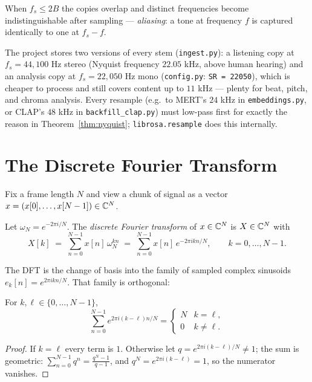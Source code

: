 When $f_s \le 2B$ the copies overlap and distinct frequencies become
indistinguishable after sampling --- \emph{aliasing}: a tone at frequency $f$
is captured identically to one at $f_s - f$.

\begin{incode}
The project stores two versions of every stem
(\texttt{ingest.py}): a listening copy at $f_s = 44{,}100$ Hz stereo
(Nyquist frequency $22.05$ kHz, above human hearing) and an analysis copy at
$f_s = 22{,}050$ Hz mono (\texttt{config.py}: \texttt{SR = 22050}), which is
cheaper to process and still covers content up to $11$ kHz --- plenty for
beat, pitch, and chroma analysis. Every resample (e.g.\ to MERT's $24$ kHz in
\texttt{embeddings.py}, or CLAP's $48$ kHz in \texttt{backfill\_clap.py})
must low-pass first for exactly the reason in
Theorem~\ref{thm:nyquist}; \texttt{librosa.resample} does this internally.
\end{incode}

\section{The Discrete Fourier Transform}

Fix a frame length $N$ and view a chunk of signal as a vector
$x = (x[0], \dots, x[N-1]) \in \mathbb{C}^N$.

\begin{definition}[DFT]\label{def:dft}
Let $\omega_N = e^{-2\pi i / N}$. The \emph{discrete Fourier transform} of
$x \in \mathbb{C}^N$ is $X \in \mathbb{C}^N$ with
\[
X[k] \;=\; \sum_{n=0}^{N-1} x[n]\, \omega_N^{kn}
\;=\; \sum_{n=0}^{N-1} x[n]\, e^{-2\pi i k n / N},
\qquad k = 0, \dots, N-1 .
\]
\end{definition}

The DFT is the change of basis into the family of sampled complex sinusoids
$e_k[n] = e^{2\pi i k n / N}$. That family is orthogonal:

\begin{lemma}[Orthogonality]\label{lem:orth}
For $k, \ell \in \{0, \dots, N-1\}$,
\[
\sum_{n=0}^{N-1} e^{2\pi i (k-\ell) n / N} =
\begin{cases}
N & k = \ell,\\
0 & k \ne \ell.
\end{cases}
\]
\end{lemma}

\begin{proof}
If $k = \ell$ every term is $1$. Otherwise let
$q = e^{2\pi i (k-\ell)/N} \ne 1$; the sum is geometric:
$\sum_{n=0}^{N-1} q^n = \frac{q^N - 1}{q - 1}$,
and $q^N = e^{2\pi i (k - \ell)} = 1$, so the numerator vanishes.
\end{proof}

